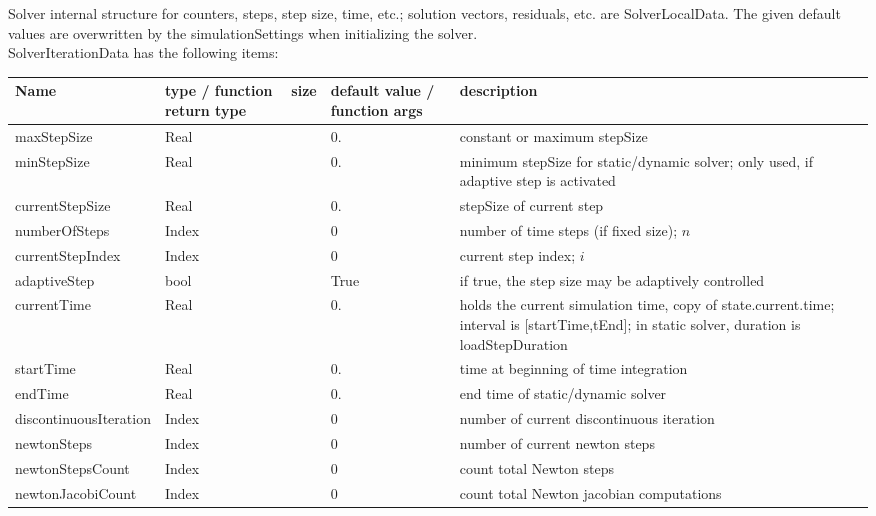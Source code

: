  \label{sec:SolverIterationData}
Solver internal structure for counters, steps, step size, time, etc.; solution vectors, residuals, etc. are SolverLocalData. The given default values are overwritten by the simulationSettings when initializing the solver.\\ 
%
SolverIterationData has the following items:
\begin{center}
  \footnotesize
  \begin{longtable}{| p{4.2cm} | p{2.5cm} | p{0.3cm} | p{3.0cm} | p{6cm} |}
    \hline
    \bf Name & \bf type / function return type & \bf size & \bf default value / function args & \bf description \\ \hline
    maxStepSize &     Real &      &     0. &     constant or maximum stepSize\\ \hline
    minStepSize &     Real &      &     0. &     minimum stepSize for static/dynamic solver; only used, if adaptive step is activated\\ \hline
    currentStepSize &     Real &      &     0. &     stepSize of current step\\ \hline
    numberOfSteps &     Index &      &     0 &     number of time steps (if fixed size); $n$\\ \hline
    currentStepIndex &     Index &      &     0 &     current step index; $i$\\ \hline
    adaptiveStep &     bool &      &     True &     if true, the step size may be adaptively controlled\\ \hline
    currentTime &     Real &      &     0. &     holds the current simulation time, copy of state.current.time; interval is [startTime,tEnd]; in static solver, duration is loadStepDuration\\ \hline
    startTime &     Real &      &     0. &     time at beginning of time integration\\ \hline
    endTime &     Real &      &     0. &     end time of static/dynamic solver\\ \hline
    discontinuousIteration &     Index &      &     0 &     number of current discontinuous iteration\\ \hline
    newtonSteps &     Index &      &     0 &     number of current newton steps\\ \hline
    newtonStepsCount &     Index &      &     0 &     count total Newton steps\\ \hline
    newtonJacobiCount &     Index &      &     0 &     count total Newton jacobian computations\\ \hline

\end{longtable}
\end{center}
